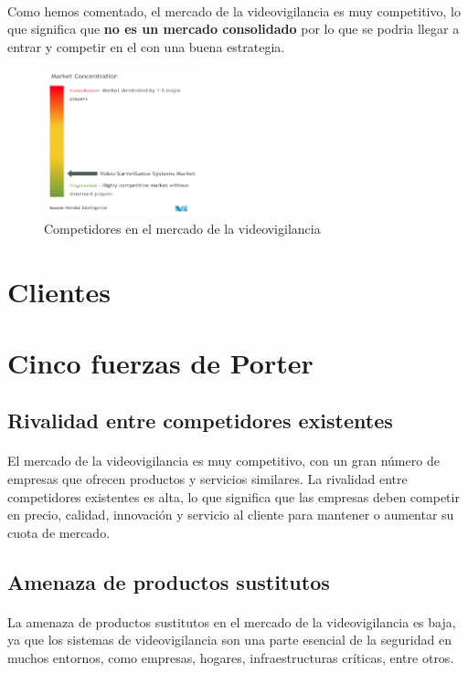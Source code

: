 \documentclass{report}
\begin{document}
        \paragraph*{}{Como hemos comentado, el mercado de la videovigilancia es muy competitivo, lo que significa que \textbf{no es un mercado consolidado} por lo que se podria llegar a entrar y competir en el con una buena estrategia.}
        \begin{figure}[H]
          \centering
          \includegraphics[width=0.4\textwidth]{./img/competidores.png}
          \caption{Competidores en el mercado de la videovigilancia}
        \end{figure}
      \section{Clientes}
      \section{Cinco fuerzas de Porter}
        \subsection*{Rivalidad entre competidores existentes}
          \paragraph*{}{El mercado de la videovigilancia es muy competitivo, con un gran número de empresas que ofrecen productos y servicios similares. La rivalidad entre competidores existentes es alta, lo que significa que las empresas deben competir en precio, calidad, innovación y servicio al cliente para mantener o aumentar su cuota de mercado.}
        \subsection*{Amenaza de productos sustitutos}
          \paragraph*{}{La amenaza de productos sustitutos en el mercado de la videovigilancia es baja, ya que los sistemas de videovigilancia son una parte esencial de la seguridad en muchos entornos, como empresas, hogares, infraestructuras críticas, entre otros.}
\end{document}
